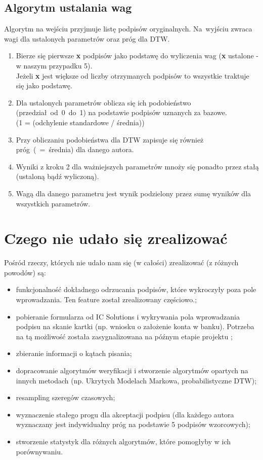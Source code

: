\documentclass[notitlepage, oneside]{report}
\begin{document}
 \section*{Algorytm ustalania wag}
 Algorytm na wejściu przyjmuje listę podpisów oryginalnych. Na~wyjściu zwraca wagi dla ustalonych parametrów oraz próg dla DTW.
 \begin{enumerate}
 \item Bierze się pierwsze \textbf{x} podpisów jako podstawę do wyliczenia wag (\textbf{x} ustalone - w naszym przypadku 5).\\Jeżeli \textbf{x} jest większe od liczby otrzymanych podpisów to wszystkie traktuje się jako podstawę.
 \item Dla ustalonych parametrów oblicza się ich podobieństwo \mbox{(przedział od 0 do 1)} na podstawie podpisów uznanych za bazowe.\\(1 = (odchylenie standardowe / średnia))
 \item Przy obliczaniu podobieństwa dla DTW zapisuje się również próg~\mbox{(~=~średnia)} dla danego autora.
 \item Wyniki z kroku 2 dla ważniejszych parametrów mnoży się ponadto przez stałą (ustaloną bądź wyliczoną).
 \item Wagą dla danego parametru jest wynik podzielony przez sumę wyników dla wszystkich parametrów.
 \end{enumerate}
 

\chapter*{Czego nie udało się zrealizować}
Pośród rzeczy, których nie udało nam się (w całości) zrealizować (z różnych powodów) są:
 \begin{itemize}
  \item funkcjonalność dokładnego odrzucania podpisów, które wykroczyły poza pole wprowadzania. Ten feature został zrealizowany częściowo.;
  \item pobieranie formularza od IC Solutions i wykrywania pola wprowadzania podpisu na skanie kartki (np. wniosku o założenie konta w banku). Potrzeba na tą możliwość została zasygnalizowana na późnym etapie projektu ;
  \item zbieranie informacji o kątach pisania;
  \item dopracowanie algorytmów weryfikacji i stworzenie algorytmów opartych na innych metodach (np. Ukrytych Modelach Markowa, probabilistyczne DTW);
  \item resampling szeregów czasowych;
  \item wyznaczenie stałego progu dla akceptacji podpisu (dla każdego autora wyznaczany jest indywidualny próg na podstawie 5 podpisów wzorcowych);
  \item stworzenie statystyk dla różnych algorytmów, które pomogłyby w ich porównywaniu.
 
 \end{itemize}
 
\end{document}
